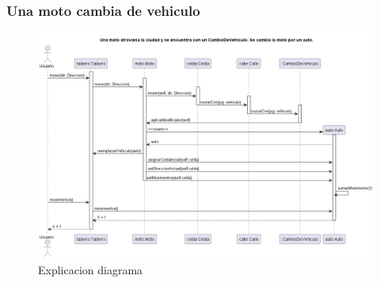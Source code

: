 \documentclass[titlepage,a4paper]{article}
\begin{document}
\subsubsection[Una moto cambia de vehiculo]{Una moto cambia de vehiculo}

\begin{figure}[H]
  \centering
  \includegraphics[width=1\textwidth]{diagramas/SecuenciaMotoCambiaVehiculo.png}
  \caption{\label{fig:class01}Explicacion diagrama}
\end{figure}
\end{document}
